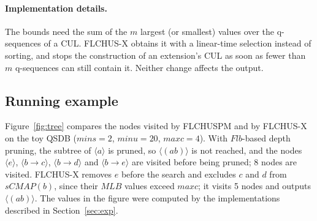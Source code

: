 \documentclass[runningheads]{llncs}
\newcommand{\FL}{\textsc{FLCHUSPM}}
\newcommand{\FX}{\textsc{FLCHUS-X}}
\newcommand{\flb}{\ensuremath{\mathit{Flb}}}
\newcommand{\mlb}{\ensuremath{\mathit{MLB}}}
\newcommand{\minu}{\ensuremath{\mathit{minu}}}
\newcommand{\maxc}{\ensuremath{\mathit{maxc}}}
\newcommand{\mins}{\ensuremath{\mathit{mins}}}
\newcommand{\seq}[1]{\langle #1\rangle}
\begin{document}
\paragraph{Implementation details.} The bounds need the sum of the $m$ largest (or smallest)
values over the q-sequences of a CUL. \FX{} obtains it with a linear-time selection instead of
sorting, and stops the construction of an extension's CUL as soon as fewer than $m$ q-sequences
can still contain it. Neither change affects the output.

\subsection{Running example}

Figure~\ref{fig:tree} compares the nodes visited by \FL{} and by \FX{} on the toy QSDB
($\mins = 2$, $\minu = 20$, $\maxc = 4$). With \flb-based depth pruning, the subtree of
$\seq{a}$ is pruned, so $\seq{(ab)}$ is not reached, and the nodes $\seq{e}$, $\seq{b \to c}$,
$\seq{b \to d}$ and $\seq{b \to e}$ are visited before being pruned; 8 nodes are visited. \FX{}
removes $e$ before the search and excludes $c$ and $d$ from $\mathit{sCMAP}(b)$, since their
\mlb{} values exceed \maxc; it visits 5 nodes and outputs $\seq{(ab)}$. The values in the figure
were computed by the implementations described in Section~\ref{sec:exp}.
\end{document}
